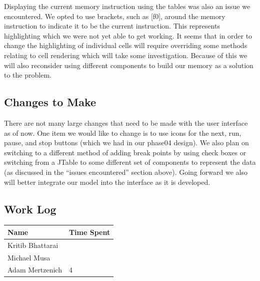 \documentclass[11pt]{article}
\begin{document}
Displaying the current memory instruction using the tables was also an issue we encountered. We opted to use brackets, such as [f0], around the memory instruction to indicate it to be the current instruction. This represents highlighting which we were not yet able to get working. It seems that in order to change the highlighting of individual cells will require overriding some methods relating to cell rendering which will take some investigation. Because of this we will also reconsider using different components to build our memory as a solution to the problem.

\subsection{Changes to Make}
\label{sec:org015da9c}

There are not many large changes that need to be made with the user interface as of now. One item we would like to change is to use icons for the next, run, pause, and stop buttons (which we had in our phase04 design). We also plan on switching to a different method of adding break points by using check boxes or switching from a JTable to some different set of components to represent the data (as discussed in the ``issues encountered'' section above). Going forward we also will better integrate our model into the interface as it is developed.

\subsection{Work Log}
\label{sec:org708319c}

\begin{center}
\begin{tabular}{ll}
Name & Time Spent\\
\hline
Kritib Bhattarai & \\
Michael Musa & \\
Adam Mertzenich & 4\\
\end{tabular}
\end{center}
\end{document}

